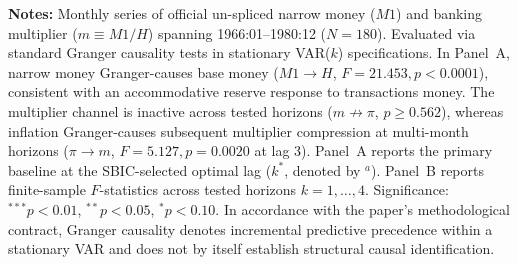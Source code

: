 \begin{table}[htbp]
{%
}
\begin{minipage}{0.96\textwidth}
\vspace{0.3em}
\footnotesize \textbf{Notes:} Monthly series of official un-spliced narrow money ($M1$) and banking multiplier ($m \equiv M1/H$) spanning 1966:01--1980:12 ($N=180$). Evaluated via standard Granger causality tests in stationary VAR($k$) specifications. In Panel~A, narrow money Granger-causes base money ($M1 \to H$, $F = 21.453, p < 0.0001$), consistent with an accommodative reserve response to transactions money. The multiplier channel is inactive across tested horizons ($m \not\to \pi$, $p \ge 0.562$), whereas inflation Granger-causes subsequent multiplier compression at multi-month horizons ($\pi \to m$, $F = 5.127, p = 0.0020$ at lag 3). Panel~A reports the primary baseline at the SBIC-selected optimal lag ($k^*$, denoted by $^a$). Panel~B reports finite-sample $F$-statistics across tested horizons $k = 1, \dots, 4$. Significance: $^{***} p < 0.01$, $^{**} p < 0.05$, $^{*} p < 0.10$. In accordance with the paper's methodological contract, Granger causality denotes incremental predictive precedence within a stationary VAR and does not by itself establish structural causal identification.
\end{minipage}
\end{table}
